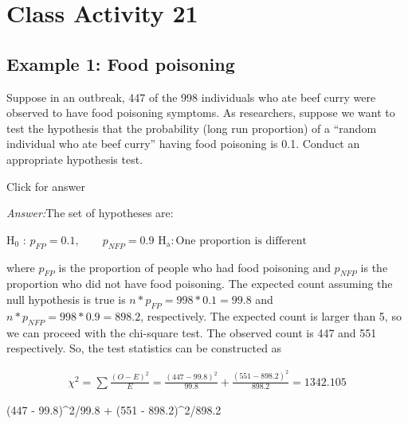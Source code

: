 \documentclass[
]{book}
\newenvironment{Shaded}{\begin{snugshade}}{\end{snugshade}}
\newcommand{\DecValTok}[1]{\textcolor[rgb]{0.00,0.00,0.81}{#1}}
\newcommand{\FloatTok}[1]{\textcolor[rgb]{0.00,0.00,0.81}{#1}}
\newcommand{\NormalTok}[1]{#1}
\newcommand{\SpecialCharTok}[1]{\textcolor[rgb]{0.00,0.00,0.00}{#1}}
\begin{document}
\hypertarget{class-activity-21}{%
\chapter{Class Activity 21}\label{class-activity-21}}

\hypertarget{example-1-food-poisoning}{%
\section{Example 1: Food poisoning}\label{example-1-food-poisoning}}

Suppose in an outbreak, 447 of the 998 individuals who ate beef curry were observed to have food poisoning symptoms. As researchers, suppose we want to test the hypothesis that the probability (long run proportion) of a ``random individual who ate beef curry'' having food poisoning is 0.1. Conduct an appropriate hypothesis test.

Click for answer

\emph{Answer:}The set of hypotheses are:

\(\mathrm{H}_0\) : \(p_{FP} = 0.1, \qquad p_{NFP} = 0.9\)
\(\mathrm{H}_{\mathrm{a}} : \text{One proportion is different}\)

where \(p_{FP}\) is the proportion of people who had food poisoning and \(p_{NFP}\) is the proportion who did not have food poisoning. The expected count assuming the null hypothesis is true is \(n*p_{FP} = 998*0.1 = 99.8\) and \(n*p_{NFP} = 998*0.9 = 898.2\), respectively. The expected count is larger than 5, so we can proceed with the chi-square test. The observed count is 447 and 551 respectively. So, the test statistics can be constructed as

\begin{align*}
\chi^2 = \sum \frac{(O-E)^2}{E} = \frac{(447 - 99.8)^2}{99.8} +   \frac{(551 - 898.2)^2}{898.2}= 1342.105
\end{align*}

\begin{Shaded}
\begin{Highlighting}[]
\NormalTok{(}\DecValTok{447} \SpecialCharTok{{-}} \FloatTok{99.8}\NormalTok{)}\SpecialCharTok{\^{}}\DecValTok{2}\SpecialCharTok{/}\FloatTok{99.8} \SpecialCharTok{+}\NormalTok{ (}\DecValTok{551} \SpecialCharTok{{-}} \FloatTok{898.2}\NormalTok{)}\SpecialCharTok{\^{}}\DecValTok{2}\SpecialCharTok{/}\FloatTok{898.2}
\end{Highlighting}
\end{Shaded}
\end{document}
